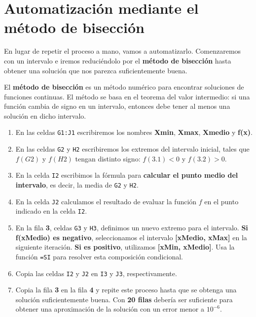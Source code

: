 \documentclass[
  spanish,
  11pt,
  a4paper,
  DIV=11,
  numbers=noendperiod]{scrartcl}
\begin{document}
\section{Automatización mediante el método de bisección}
\label{automatizacion-mediante-el-metodo-de-biseccion}

En lugar de repetir el proceso a mano, vamos a automatizarlo. Comenzaremos con un intervalo e iremos reduciéndolo por el \textbf{método de bisección} hasta obtener una solución que nos parezca suficientemente buena.

El \textbf{método de bisección} es un método numérico para encontrar soluciones de funciones continuas. El método se basa en el teorema del valor intermedio: si una función cambia de signo en un intervalo, entonces debe tener al menos una solución en dicho intervalo.

\begin{enumerate}
\item En las celdas \texttt{G1:J1} escribiremos los nombres \textbf{Xmin}, \textbf{Xmax}, \textbf{Xmedio} y \textbf{f(x)}.
\item En las celdas \texttt{G2} y \texttt{H2} escribiremos los extremos del intervalo inicial, tales que \(f(G2)\) y \(f(H2)\) tengan distinto signo: \(f(3.1) < 0\) y \(f(3.2) > 0\).
\item En la celda \texttt{I2} escribimos la fórmula para \textbf{calcular el punto medio del intervalo}, es decir, la media de \texttt{G2} y \texttt{H2}.
\item En la celda \texttt{J2} calculamos el resultado de evaluar la función \(f\) en el punto indicado en la celda \texttt{I2}.
\item En la fila \textbf{3}, celdas \texttt{G3} y \texttt{H3}, definimos un nuevo extremo para el intervalo. \textbf{Si f(xMedio) es negativo}, seleccionamos el intervalo \textbf{[xMedio, xMax]} en la siguiente iteración. \textbf{Si es positivo}, utilizamos \textbf{[xMin, xMedio]}. Usa la función \texttt{=SI} para resolver esta composición condicional.
\item Copia las celdas \texttt{I2} y \texttt{J2} en \texttt{I3} y \texttt{J3}, respectivamente.
\item Copia la fila \textbf{3} en la fila \textbf{4} y repite este proceso hasta que se obtenga una solución suficientemente buena. Con \textbf{20 filas} debería ser suficiente para obtener una aproximación de la solución con un error menor a \(10^{-6}\).
\end{enumerate}
\end{document}
